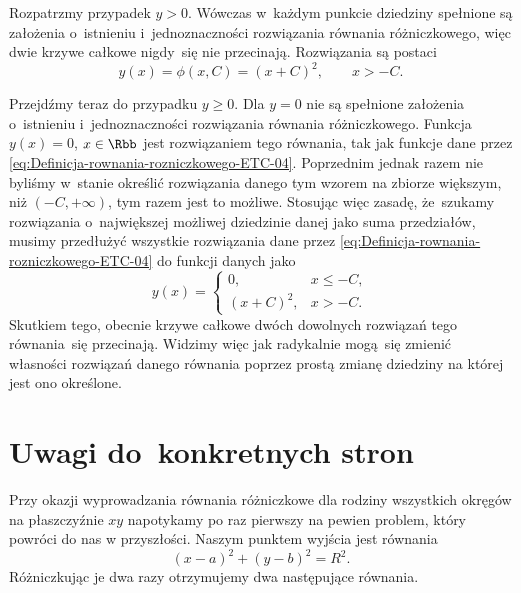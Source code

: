 \documentclass[a4paper,11pt]{article}
\numberwithin{equation}{section}
\begin{document}
Rozpatrzmy przypadek $y > 0$. Wówczas w~każdym punkcie dziedziny spełnione
są założenia o~istnieniu i~jednoznaczności rozwiązania równania
różniczkowego, więc dwie krzywe całkowe nigdy~się nie przecinają.
Rozwiązania są postaci
\begin{equation}
  \label{eq:Definicja-rownania-rozniczkowego-ETC-04}
  y( x ) = \phi( x, C ) = ( x + C )^{ 2 }, \qquad
  x > -C.
\end{equation}

Przejdźmy teraz do przypadku $y \geq 0$. Dla $y = 0$ nie są spełnione
założenia o~istnieniu i~jednoznaczności rozwiązania równania różniczkowego.
Funkcja $y( x ) = 0$, $x \in \Rbb$ jest rozwiązaniem tego równania, tak jak
funkcje dane przez \eqref{eq:Definicja-rownania-rozniczkowego-ETC-04}.
Poprzednim jednak razem nie byliśmy w~stanie określić rozwiązania danego
tym wzorem na zbiorze większym, niż $( -C, +\infty )$, tym razem jest to możliwe.
Stosując więc zasadę, że~szukamy rozwiązania o~największej możliwej
dziedzinie danej jako suma przedziałów, musimy przedłużyć wszystkie
rozwiązania dane przez \eqref{eq:Definicja-rownania-rozniczkowego-ETC-04}
do funkcji danych jako
\begin{equation}
  \label{eq:Definicja-rownania-rozniczkowego-ETC-05}
  y( x ) =
  \begin{cases}
    0, & x \leq -C, \\
    ( x + C )^{ 2 }, & x > -C.
  \end{cases}
\end{equation}
Skutkiem tego, obecnie krzywe całkowe dwóch dowolnych rozwiązań tego
równania~się przecinają. Widzimy więc jak radykalnie mogą~się zmienić
własności rozwiązań danego równania poprzez prostą zmianę dziedziny na
której jest ono określone.














\section{Uwagi do~konkretnych stron}

\label{sec:Uwagi-do-konkrentych-stron}

\VerSpaceFour


\noindent
{} Przy okazji wyprowadzania równania różniczkowe dla rodziny
wszystkich okręgów na płaszczyźnie $xy$ napotykamy po raz pierwszy na
pewien problem, który powróci do nas w przyszłości. Naszym punktem wyjścia
jest równania
\begin{equation}
  \label{eq:Uwagi-do-konkrentych-stron-01}
  ( x - a )^{ 2 } + ( y - b )^{ 2 } = R^{ 2 }.
\end{equation}
Różniczkując je dwa razy otrzymujemy dwa następujące równania.
\end{document}
